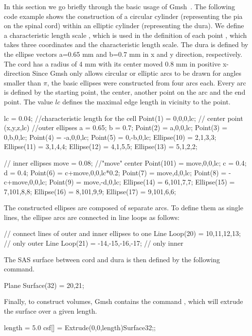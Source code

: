 In this section we go briefly through the basic usage of
Gmsh~\citep{GeuzaineRemacle}.  The following code example shows the
construction of a circular cylinder (representing the pia on the
spinal cord) within an elliptic cylinder (representing the dura).  We
define a characteristic length scale , which is used in the
definition of each point , which takes three coordinates
and the characteristic length scale.  The dura is defined by the
ellipse vectors a=0.65 mm and b=0.7 mm in x and y direction,
respectively. The cord has a radius of 4 mm with its center moved 0.8
mm in positive x-direction Since Gmsh only allows circular or elliptic
arcs to be drawn for angles smaller than $\pi$, the basic ellipses
were constructed from four arcs each. Every arc is defined by the
starting point, the center, another point on the arc and the end
point. The value $lc$ defines the maximal edge length in vicinity to
the point.
\begin{anycode}
lc = 0.04;  //characteristic length for the cell
Point(1) = {0,0,0,lc};	// center point (x,y,z,lc)
//outer ellipses
a = 0.65;
b = 0.7;
Point(2) = {a,0,0,lc};
Point(3) = {0,b,0,lc};
Point(4) = {-a,0,0,lc};
Point(5) = {0,-b,0,lc};
Ellipse(10) = {2,1,3,3};
Ellipse(11) = {3,1,4,4};
Ellipse(12) = {4,1,5,5};
Ellipse(13) = {5,1,2,2};

// inner ellipses
move = 0.08; //"move" center
Point(101) = {move,0,0,lc};
c = 0.4;
d = 0.4;
Point(6) = {c+move,0,0,lc*0.2};
Point(7) = {move,d,0,lc};
Point(8) = {-c+move,0,0,lc};
Point(9) = {move,-d,0,lc};
Ellipse(14) = {6,101,7,7};
Ellipse(15) = {7,101,8,8};
Ellipse(16) = {8,101,9,9};
Ellipse(17) = {9,101,6,6};
\end{anycode}

The constructed ellipses are composed of separate arcs. To define them
as single lines, the ellipse arcs are connected in line loops as
follows:
\begin{anycode}
// connect lines of outer and inner ellipses to one
Line Loop(20) = {10,11,12,13};		// only outer
Line Loop(21) = {-14,-15,-16,-17};	// only inner
\end{anycode}
The SAS surface between cord and dura is then defined by the following command.
\begin{anycode}
Plane Surface(32) = {20,21};
\end{anycode}

Finally, to construct volumes, Gmsh contains the command , which will extrude the surface over a given length.
\begin{anycode}
length = 5.0
csf[] = Extrude(0,0,length){Surface{32};};
\end{anycode}

